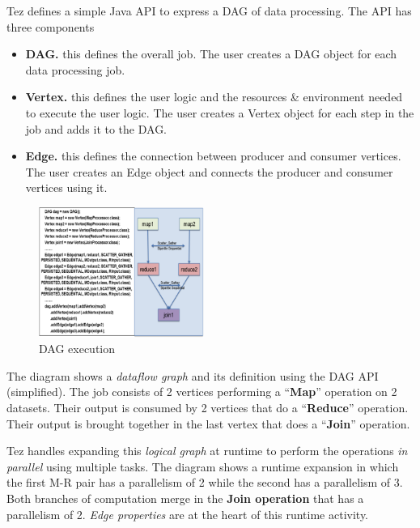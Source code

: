 \documentclass[twocolumn]{article}
\begin{document}
Tez defines a simple Java API to express a DAG of data processing. The
API has three components

\begin{itemize}
\itemsep1pt\parskip0pt
\item
  \textbf{DAG.} this defines the overall job. The user creates a DAG
  object for each data processing job.\\
\item
  \textbf{Vertex.} this defines the user logic and the resources \&
  environment needed to execute the user logic. The user creates a
  Vertex object for each step in the job and adds it to the DAG.\\
\item
  \textbf{Edge.} this defines the connection between producer and
  consumer vertices. The user creates an Edge object and connects the
  producer and consumer vertices using it.
\end{itemize}

\begin{figure}[htb]
        \centering
        \includegraphics[width=0.48\textwidth]{tez11}
        \caption{DAG execution}
        \label{fig05}
\end{figure}

The diagram shows a \emph{dataflow graph} and its definition using the
DAG API (simplified). The job consists of 2 vertices performing a
``\textbf{Map}'' operation on 2 datasets. Their output is consumed by 2
vertices that do a ``\textbf{Reduce}'' operation. Their output is
brought together in the last vertex that does a ``\textbf{Join}''
operation.

Tez handles expanding this \emph{logical graph} at runtime to perform
the operations \emph{in parallel} using multiple tasks. The diagram
shows a runtime expansion in which the first M-R pair has a parallelism
of 2 while the second has a parallelism of 3. Both branches of
computation merge in the \textbf{Join operation} that has a parallelism
of 2. \emph{Edge properties} are at the heart of this runtime activity.
\end{document}
